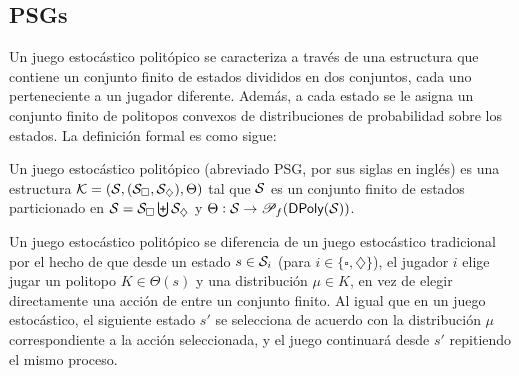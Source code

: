 
\subsection*{PSGs}


Un juego estocástico politópico se caracteriza a través de una estructura que
contiene un conjunto finito de estados divididos en dos conjuntos, cada uno
perteneciente a un jugador diferente. Además, a cada estado se le asigna un
conjunto finito de politopos convexos de distribuciones de probabilidad sobre
los estados. La definición formal es como sigue:

\begin{definition}[PSG]
	Un juego estocástico politópico (abreviado PSG, por sus siglas en inglés) es una estructura \( \mathcal{K} = (\mathcal{S}, (\mathcal{S}_\square, \mathcal{S}_\diamondsuit), \Theta) \) tal que \( \mathcal{S} \) es un conjunto finito de estados particionado en \( \mathcal{S} = \mathcal{S}_\square \biguplus \mathcal{S}_\diamondsuit \) y \( \Theta : \mathcal{S} \to \mathscr{P}_f(\textsf{DPoly}(\mathcal{S})) \).
\end{definition}

Un juego estocástico politópico se diferencia de un juego estocástico
tradicional por el hecho de que desde un estado \( s \in \mathcal{S}_i \) (para \( i
\in \{ \square, \diamondsuit \} \)), el jugador \( i \) elige jugar un politopo
\( K \in \Theta(s) \) y una distribución \( \mu \in K \), en vez de elegir
directamente una acción de entre un conjunto finito. Al igual que en un juego
estocástico, el siguiente estado \( s' \) se selecciona de acuerdo con la
distribución \( \mu \) correspondiente a la acción seleccionada, y el juego
continuará desde \( s' \) repitiendo el mismo proceso.

